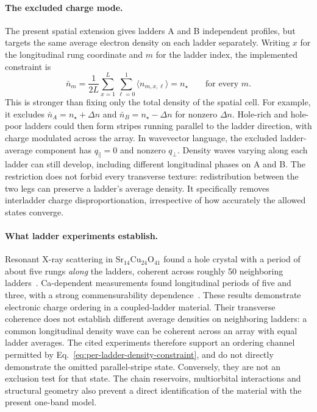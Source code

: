 \documentclass[11pt,letterpaper]{article}
\newcommand{\avg}[1]{\langle #1\rangle}
\begin{document}
\paragraph{The excluded charge mode.}
The present spatial extension gives ladders A and B independent profiles,
but targets the same average electron density on each ladder separately.
Writing $x$ for the longitudinal rung coordinate and $m$ for the ladder index,
the implemented constraint is
\begin{equation}
 \bar n_m=\frac{1}{2L}\sum_{x=1}^{L}\sum_{\ell=0}^{1}
 \avg{n_{m,x,\ell}}=n_\star\qquad\text{for every }m.
 \label{eq:per-ladder-density-constraint}
\end{equation}
This is stronger than fixing only the total density of the spatial cell.
For example, it excludes $\bar n_A=n_\star+\Delta n$ and
$\bar n_B=n_\star-\Delta n$ for nonzero $\Delta n$. Hole-rich and hole-poor
ladders could then form stripes running parallel to the ladder direction,
with charge modulated across the array. In wavevector language, the excluded
ladder-average component has $q_\parallel=0$ and nonzero $q_\perp$.
Density waves varying along each ladder can still develop, including
different longitudinal phases on A and B. The restriction does not forbid
every transverse texture: redistribution between the two legs can preserve
a ladder's average density. It specifically removes interladder charge
disproportionation, irrespective of how accurately the allowed states converge.

\paragraph{What ladder experiments establish.}
Resonant X-ray scattering in $\mathrm{Sr}_{14}\mathrm{Cu}_{24}\mathrm{O}_{41}$
found a hole crystal with a period of about five rungs \emph{along} the ladders,
coherent across roughly 50 neighboring ladders~\citep{Abbamonte2004}.
Ca-dependent measurements found longitudinal periods of five and three,
with a strong commensurability dependence~\citep{Rusydi2006}. These results
demonstrate electronic charge ordering in a coupled-ladder material. Their
transverse coherence does not establish different average densities on
neighboring ladders: a common longitudinal density wave can be coherent
across an array with equal ladder averages. The cited experiments therefore
support an ordering channel permitted by Eq.~\eqref{eq:per-ladder-density-constraint},
and do not directly demonstrate the omitted parallel-stripe state. Conversely,
they are not an exclusion test for that state. The chain reservoirs,
multiorbital interactions and structural geometry also prevent a direct
identification of the material with the present one-band model.
\end{document}
